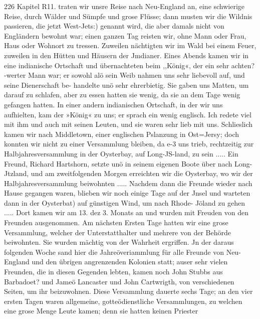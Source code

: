 226 Kapitel R11.
traten wir unsre Reise nach Neu-England an, eine schwierige
Reise, durch Wälder und Sümpfe und grose Flüsse; dann musten
wir die Wildnis passieren, die jetzt West-Jets:) genannt wird,
die aber damals nicht von Engländern bewohnt war; einen ganzen
Tag reisten wir, ohne Mann oder Frau, Haus oder Wohnort
zu tressen. Zuweilen nächtigten wir im Wald bei einem Feuer,
zuweilen in den Hütten und Häusern der Jmdianer. Eines Abends
kamen wir in eine indianische Ortschaft und übernachteten beim
,,König«, der ein sehr achten?-werter Mann war; er sowohl alö sein
Weib nahmen uns sehr liebevoll auf, und seine Dienerschaft be-
handelte unö sehr ehrerbietig. Sie gaben uns Matten, um darauf
zu schlafen, aber zu essen hatten sie wenig, da sie an dem Tage
wenig gefangen hatten. In einer andern indianischen Ortschaft, in
der wir uns aufhielten, kam der »König« zu uns; er sprach ein
wenig englisch. Ich redete viel mit ihm und auch mit seinen
Leuten, und sie waren sehr lieb mit uns. Schlieslich kamen
wir nach Middletown, einer englischen Pslanzung in Ost=Jersy;
doch konnten wir nicht zu einer Versammlung bleiben, da e-3 uns
trieb, rechtzeitig zur Halbjahresversammlung in der Oysterbay,
auf Long-JS-land, zu sein ..... Ein Freund, Richard Hartshorn,
setzte unö in seinem eigenen Boote über nach Long-Jtzland, und
am zweitfolgenden Morgen erreichten wir die Oysterbay, wo wir der
Halbjahresversammlung beiwohnten ..... Nachdem dann die
Freunde wieder nach Hause gegangen waren, blieben wir noch
einige Tage auf der Jnsel und warteten dann in der Oysterbat)
auf günstigen Wind, um nach Rhode- Jöland zu gehen .....
Dort kamen wir am 13. dez 3. Monats an und wurden mit
Freuden von den Freunden ausgenommen. Am nächsten
Ersten Tage hatten wir eine grose Versammlung, welcher der
Unterstatthalter und mehrere von der Behörde beiwohnten. Sie
wurden mächtig von der Wahrheit ergriffen. Jn der daraus
folgenden Woche sand hier die Jahreöveriammlung für alle Freunde
von Neu-England und den übrigen angrenzenden Kolonien statt;
auser sehr vielen Freunden, die in diesen Gegenden lebten, kamen
noch John Stubbs aus Barbadoet? und Jameö Lancaster und
John Cartwrigth, von verschiedenen Seiten, um ihr beizuwohnen.
Diese Versammlung dauerte sechs Tage; an den vier ersten Tagen
waren allgemeine, gotteödienstliche Versammlungen, zu welchen
eine grose Menge Leute kamen; denn sie hatten keinen Priester


